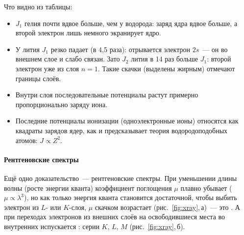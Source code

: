 Что видно из таблицы:
\begin{itemize}
\item $J_1$ гелия почти вдвое больше, чем у водорода: заряд ядра вдвое
больше, а второй электрон лишь немного экранирует ядро.
\item У лития $J_1$ резко падает (в 4,5 раза): отрывается электрон
$2s$~— он во внешнем слое и слабо связан. Зато $J_2$ лития в 14 раз
больше $J_1$: второй электрон уже из слоя $n=1$. Такие скачки (выделены
жирным) отмечают границы слоёв.
\item Внутри слоя последовательные потенциалы растут примерно
пропорционально заряду иона.
\item Последние потенциалы ионизации (одноэлектронные ионы) относятся
как квадраты зарядов ядер, как и предсказывает теория
водородоподобных атомов: $J\propto Z^2$.
\end{itemize}

\paragraph{Рентгеновские спектры}
Ещё одно доказательство~— рентгеновские спектры. При уменьшении длины
волны (росте энергии кванта) коэффициент поглощения $\mu$ плавно
убывает ($\mu\propto\lambda^3$), но как только энергия кванта становится
достаточной, чтобы выбить электрон из $L$- или $K$-слоя, $\mu$ скачком
возрастает (рис.~\ref{fig:xray},\,а)~— это . А при
переходах электронов из внешних слоёв на освободившиеся места во
внутренних испускается : серии $K$,
$L$, $M$ (рис.~\ref{fig:xray},\,б).

